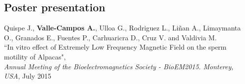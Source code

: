 \documentclass[margin,line]{res}
\newenvironment{list2}{
  \begin{list}{$\bullet$}{%
      \setlength{\itemsep}{0in}
      \setlength{\parsep}{0in} \setlength{\parskip}{0in}
      \setlength{\topsep}{0in} \setlength{\partopsep}{0in}
      \setlength{\leftmargin}{0.2in}}}{\end{list}}
\begin{document}
\begin{resume}



\section{\sc Poster presentation}

Quispe J., \textbf{Valle-Campos A.}, Ulloa G., Rodriguez L., Li{\~n}an A., Limaymanta O., Granados E., Fuentes P., Carhuaricra D., Cruz V. and Valdivia M.\\ ``In vitro effect of Extremely Low Frequency Magnetic Field on the sperm motility of Alpacas", \\ {\em Annual Meeting of the Bioelectromagnetics Society - BioEM2015. Monterey, USA}, July 2015\\%




\end{resume}
\end{document}
